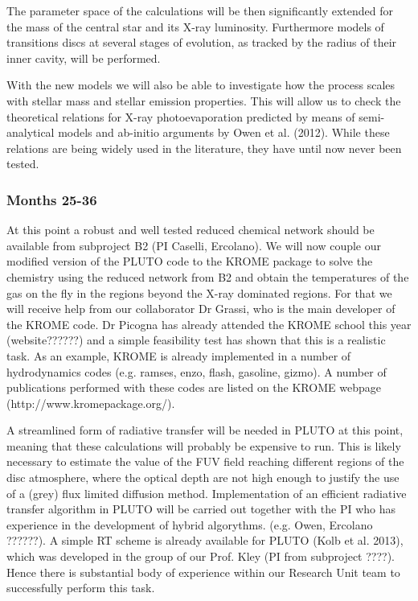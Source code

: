 \documentclass[10pt,fleqn,twoside]{article}
\begin{document}
The parameter space of the calculations will be then
significantly extended for the mass of the central star and its X-ray
luminosity. Furthermore models of transitions discs at several stages
of evolution, as tracked by the radius of their inner cavity, will be
performed. 

With the new models we will also be able to investigate how
the process scales with stellar mass and stellar emission
properties. This will allow us to check the
theoretical relations for X-ray photoevaporation 
predicted by means of semi-analytical models and ab-initio arguments
by Owen et al. (2012). While these relations are being widely used in
the literature, they have until now never been tested.\\

\subsubsection{Months 25-36} 
At this point a robust and well tested reduced chemical network should
be available from subproject B2 (PI Caselli, Ercolano). 
We will now couple our modified version of the PLUTO code to the
KROME package to solve the chemistry using the reduced network from B2
and obtain the temperatures of
the gas on the fly in the regions beyond the X-ray
dominated regions. For that we will receive help from our collaborator
Dr Grassi, who is the main developer of the KROME code. Dr Picogna has
already attended the KROME school this year (website??????) and a simple
feasibility test has shown that this is a realistic task. As an
example, KROME is already implemented in a number of hydrodynamics
codes (e.g. {\sc ramses, enzo, flash, gasoline, gizmo}). A number of
publications performed with these codes are listed on the KROME
webpage (http://www.kromepackage.org/).

A streamlined form of radiative transfer
will be needed in PLUTO at this point, meaning that these calculations will
probably be expensive to run.  This is likely necessary to estimate the value of the  FUV field
reaching different regions of the disc atmosphere, where the optical
depth are not high enough to justify the use of a  (grey) flux
limited diffusion method.  Implementation of an efficient
radiative transfer algorithm in PLUTO will be carried out together
with the PI who has experience in the development of hybrid
algorythms. (e.g. Owen, Ercolano ??????). A simple RT scheme is
already available for PLUTO (Kolb et al. 2013), which was developed in
the group of our Prof. Kley (PI from subproject ????). Hence there is
substantial body of experience within our Research Unit team to
successfully perform this task.
\end{document}
